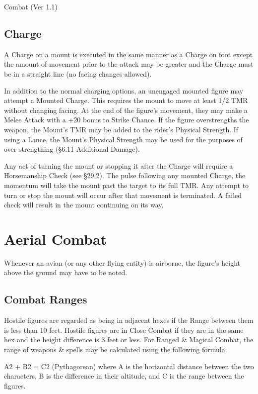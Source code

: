 \begin{Chapter}{Combat (Ver 1.1)}
\subsection{Charge}

A Charge on a mount is executed in the same manner as a Charge on foot
except the amount of movement prior to the attack may be greater and
the Charge must be in a straight line (no facing changes allowed).

In addition to the normal charging options, an unengaged mounted
figure may attempt a Mounted Charge.  This requires the mount to move
at least 1/2 TMR without changing facing.  At the end of the figure’s
movement, they may make a Melee Attack with a +20 bonus to Strike
Chance.  If the figure overstrengths the weapon, the Mount’s TMR may
be added to the rider’s Physical Strength.  If using a Lance, the
Mount’s Physical Strength may be used for the purposes of
over-strengthing (§6.11 Additional Damage).

Any act of turning the mount or stopping it after the Charge will
require a Horsemanship Check (see §29.2).  The pulse following any
mounted Charge, the momentum will take the mount past the target to
its full TMR.  Any attempt to turn or stop the mount will occur after
that movement is terminated.  A failed check will result in the mount
continuing on its way.

\section{Aerial Combat}

Whenever an avian (or any other flying entity) is airborne, the
figure’s height above the ground may have to be noted.

\subsection{Combat Ranges}

Hostile figures are regarded as being in adjacent hexes if the Range
between them is less than 10 feet. Hostile figures are in Close Combat
if they are in the same hex and the height difference is 3 feet or
less.  For Ranged \& Magical Combat, the range of weapons \& spells
may be calculated using the following formula:

A2 + B2 = C2 (Pythagorean) where A is the horizontal distance between
the two characters, B is the difference in their altitude, and C is
the range between the figures.


\end{Chapter}
